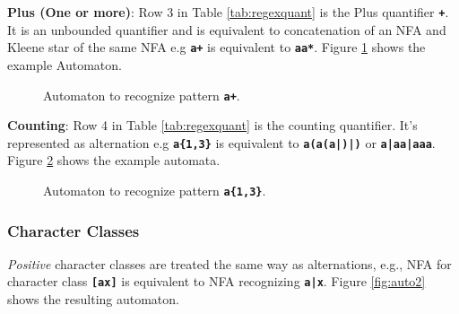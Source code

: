 \noindent
\textbf{Plus (One or more)}: Row 3 in Table \ref{tab:regexquant} is the Plus quantifier \texttt{\textbf{+}}. It is an unbounded quantifier and is equivalent to concatenation of an NFA and Kleene star of the same NFA e.g \texttt{\textbf{a+}} is equivalent to \texttt{\textbf{aa*}}. Figure \ref{fig:autoq2} shows the example Automaton.

\begin{figure}[htpb]
\centering
{}
\caption{Automaton to recognize pattern \texttt{\textbf{a+}}.}
\label{fig:autoq2}
\end{figure}

\newpage
\textbf{Counting}: Row 4 in Table \ref{tab:regexquant} is the counting quantifier. It's represented as alternation e.g \texttt{\textbf{a\{1,3\}}} is equivalent to \texttt{\textbf{a(a(a|\epsilon)|\epsilon)}} or \texttt{\textbf{a|aa|aaa}}. Figure \ref{fig:autoq4} shows the example automata.

\begin{figure}[H]
\centering
{}
\caption{Automaton to recognize pattern \texttt{\textbf{a\{1,3\}}}.}
\label{fig:autoq4}
\end{figure}
\subsubsection{Character Classes}
\textit{Positive} character classes are treated the same way as alternations, e.g., NFA for character class \texttt{\textbf{[ax]}} is equivalent to NFA recognizing \texttt{\textbf{a|x}}. Figure \ref{fig:auto2} shows the resulting automaton.

